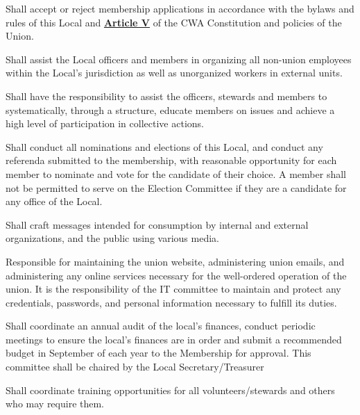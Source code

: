 \documentclass[11pt]{article}
\let\oldhref\href
\renewcommand{\href}[2]{\oldhref{#1}{\bfseries#2}}
\begin{document}
\begin{description}[labelwidth=\linewidth, listparindent=0pt]
\item[Membership Committee]
Shall accept or reject membership applications in accordance with the bylaws and rules of this Local and \href{https://cwa-union.org/for-locals/cwa-constitution\#A5}{Article V} of the CWA Constitution and policies of the Union.

\item[Organizing Committee]
Shall assist the Local officers and members in organizing all non-union employees within the Local's jurisdiction as well as unorganized workers in external units.
\item[Mobilization Committee]
Shall have the responsibility to assist the officers, stewards and members to systematically, through a structure, educate members on issues and achieve a high level of participation in collective actions.

\item[Election Committee]
Shall conduct all nominations and elections of this Local, and conduct any referenda submitted to the membership,  with reasonable opportunity for each member to nominate and vote for the candidate of their choice. A member shall not be permitted to serve on the Election Committee if they are a candidate for any office of the Local.

\item[Communications Committee]
  Shall craft messages intended for consumption by internal and external organizations, and the public using various media.

\item[IT Committee]
Responsible for maintaining the union website, administering union emails, and administering any online services necessary for the well-ordered operation of the union. It is the responsibility of the IT committee to maintain and protect any credentials, passwords, and personal information necessary to fulfill its duties.

\item[Finance Committee]

Shall coordinate an annual audit of the local’s finances, conduct periodic meetings to ensure the local’s finances are in order and submit a recommended budget in September of each year to the Membership for approval. This committee shall be chaired by the Local Secretary/Treasurer

\item[Education Committee]
Shall coordinate training opportunities for all volunteers/stewards and others who may require them.


\end{description}
\end{document}
